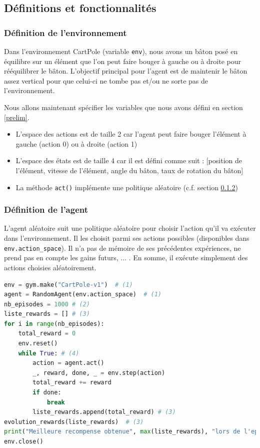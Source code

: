 \documentclass[10pt,a4paper]{article}
\begin{document}
\subsection{Définitions et fonctionnalités}

\subsubsection{Définition de l'environnement}

Dans l'environnement CartPole (variable \lstinline{env}), nous avons un bâton posé en équilibre sur un élément que l'on peut faire bouger à gauche ou à droite pour rééquilibrer le bâton. L'objectif principal pour l'agent est de maintenir le bâton assez vertical pour que celui-ci ne tombe pas et/ou ne sorte pas de l'environnement.

Nous allons maintenant spécifier les variables que nous avons défini en section \ref{prelim}.
\begin{itemize}
	\item L'espace des actions est de taille 2 car l'agent peut faire bouger l'élément à gauche (action 0) ou à droite (action 1)
	\item L'espace des états est de taille 4 car il est défini comme suit : [position de l'élément, vitesse de l'élément, angle du bâton, taux de rotation du bâton]
	\item La méthode \lstinline{act()} implémente une politique aléatoire (c.f. section \ref{defAgentRand})
\end{itemize}

\subsubsection{Définition de l'agent} \label{defAgentRand}

L'agent aléatoire suit une politique aléatoire pour choisir l'action qu'il va exécuter dans l'environnement. Il les choisit parmi ses actions possibles (disponibles dans \lstinline{env.action_space}). Il n'a pas de mémoire de ses précédentes expériences, ne prend pas en compte les gains futurs, ... . En somme, il exécute simplement des actions choisies aléatoirement.

\begin{lstlisting}[language=Python, caption=Programme principal de l'agent aléatoire]
env = gym.make("CartPole-v1")  # (1)
agent = RandomAgent(env.action_space)  # (1)
nb_episodes = 1000 # (2)
liste_rewards = [] # (3)
for i in range(nb_episodes): 
    total_reward = 0
    env.reset()
    while True: # (4)
        action = agent.act()
        _, reward, done, _ = env.step(action)
        total_reward += reward
        if done:
            break
        liste_rewards.append(total_reward) # (3)
evolution_rewards(liste_rewards)  # (3)
print("Meilleure recompense obtenue", max(liste_rewards), "lors de l'episode", liste_rewards.index(max(liste_rewards))) # (3)
env.close()

\end{lstlisting}
\end{document}
